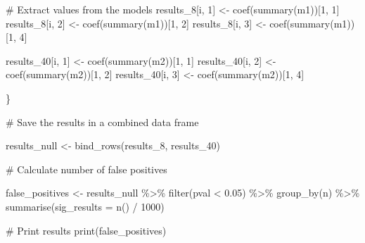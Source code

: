 \documentclass[
  letterpaper,
  DIV=11,
  numbers=noendperiod]{scrreprt}
\newenvironment{Shaded}{\begin{snugshade}}{\end{snugshade}}
\newcommand{\AttributeTok}[1]{\textcolor[rgb]{0.40,0.45,0.13}{#1}}
\newcommand{\CommentTok}[1]{\textcolor[rgb]{0.37,0.37,0.37}{#1}}
\newcommand{\DecValTok}[1]{\textcolor[rgb]{0.68,0.00,0.00}{#1}}
\newcommand{\FloatTok}[1]{\textcolor[rgb]{0.68,0.00,0.00}{#1}}
\newcommand{\FunctionTok}[1]{\textcolor[rgb]{0.28,0.35,0.67}{#1}}
\newcommand{\NormalTok}[1]{\textcolor[rgb]{0.00,0.23,0.31}{#1}}
\newcommand{\OtherTok}[1]{\textcolor[rgb]{0.00,0.23,0.31}{#1}}
\newcommand{\SpecialCharTok}[1]{\textcolor[rgb]{0.37,0.37,0.37}{#1}}
\begin{document}
\begin{Shaded}
\begin{Highlighting}[]
  \CommentTok{\# Extract values from the models}
\NormalTok{  results\_8[i, }\DecValTok{1}\NormalTok{] }\OtherTok{\textless{}{-}} \FunctionTok{coef}\NormalTok{(}\FunctionTok{summary}\NormalTok{(m1))[}\DecValTok{1}\NormalTok{, }\DecValTok{1}\NormalTok{]}
\NormalTok{  results\_8[i, }\DecValTok{2}\NormalTok{] }\OtherTok{\textless{}{-}} \FunctionTok{coef}\NormalTok{(}\FunctionTok{summary}\NormalTok{(m1))[}\DecValTok{1}\NormalTok{, }\DecValTok{2}\NormalTok{]}
\NormalTok{  results\_8[i, }\DecValTok{3}\NormalTok{] }\OtherTok{\textless{}{-}} \FunctionTok{coef}\NormalTok{(}\FunctionTok{summary}\NormalTok{(m1))[}\DecValTok{1}\NormalTok{, }\DecValTok{4}\NormalTok{]}

\NormalTok{  results\_40[i, }\DecValTok{1}\NormalTok{] }\OtherTok{\textless{}{-}} \FunctionTok{coef}\NormalTok{(}\FunctionTok{summary}\NormalTok{(m2))[}\DecValTok{1}\NormalTok{, }\DecValTok{1}\NormalTok{]}
\NormalTok{  results\_40[i, }\DecValTok{2}\NormalTok{] }\OtherTok{\textless{}{-}} \FunctionTok{coef}\NormalTok{(}\FunctionTok{summary}\NormalTok{(m2))[}\DecValTok{1}\NormalTok{, }\DecValTok{2}\NormalTok{]}
\NormalTok{  results\_40[i, }\DecValTok{3}\NormalTok{] }\OtherTok{\textless{}{-}} \FunctionTok{coef}\NormalTok{(}\FunctionTok{summary}\NormalTok{(m2))[}\DecValTok{1}\NormalTok{, }\DecValTok{4}\NormalTok{]}
  
  
\NormalTok{\}}


\CommentTok{\# Save the results in a combined data frame}

\NormalTok{results\_null }\OtherTok{\textless{}{-}} \FunctionTok{bind\_rows}\NormalTok{(results\_8, results\_40)}
\end{Highlighting}
\end{Shaded}

\begin{Shaded}
\begin{Highlighting}[]
\CommentTok{\# Calculate number of false positives}

\NormalTok{false\_positives }\OtherTok{\textless{}{-}}\NormalTok{ results\_null }\SpecialCharTok{\%\textgreater{}\%}
  \FunctionTok{filter}\NormalTok{(pval }\SpecialCharTok{\textless{}} \FloatTok{0.05}\NormalTok{) }\SpecialCharTok{\%\textgreater{}\%}
  \FunctionTok{group\_by}\NormalTok{(n) }\SpecialCharTok{\%\textgreater{}\%}
  \FunctionTok{summarise}\NormalTok{(}\AttributeTok{sig\_results =} \FunctionTok{n}\NormalTok{() }\SpecialCharTok{/} \DecValTok{1000}\NormalTok{)}

\CommentTok{\# Print results}
\FunctionTok{print}\NormalTok{(false\_positives)}
\end{Highlighting}
\end{Shaded}
\end{document}
